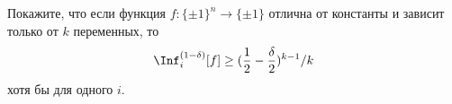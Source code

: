 Покажите, что если функция $f\colon \{\pm 1\}^n \to \{\pm 1\}$ отлична от константы и зависит только от
$k$ переменных, то
$$
    \Inf_i^{(1 - \delta)}[f] \ge (\frac{1}{2} - \frac{\delta}{2})^{k - 1} / k
$$
хотя бы для одного $i$.